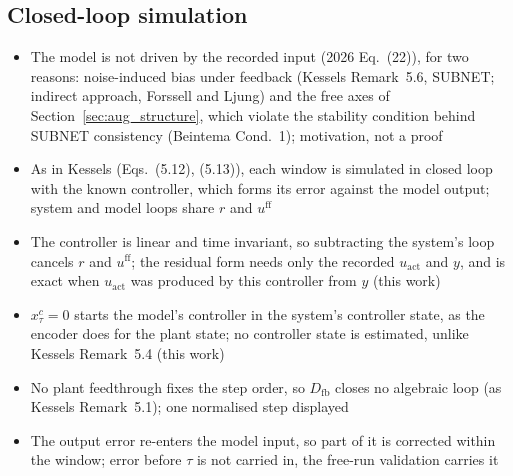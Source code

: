 

\subsection{Closed-loop simulation}\label{sec:aug_loop}
\ifdraft
\begin{itemize}
\item The model is not driven by the recorded input (2026 Eq.~(22)), for two reasons: noise-induced bias under feedback (Kessels Remark~5.6, SUBNET; indirect approach, Forssell and Ljung) and the free axes of Section~\ref{sec:aug_structure}, which violate the stability condition behind SUBNET consistency (Beintema Cond.~1); motivation, not a proof
\item As in Kessels (Eqs.~(5.12), (5.13)), each window is simulated in closed loop with the known controller, which forms its error against the model output; system and model loops share $r$ and $u^{\mathrm{ff}}$
\item The controller is linear and time invariant, so subtracting the system's loop cancels $r$ and $u^{\mathrm{ff}}$; the residual form needs only the recorded $u_{\mathrm{act}}$ and $y$, and is exact when $u_{\mathrm{act}}$ was produced by this controller from $y$ (this work)
\item $x^{c}_\tau=0$ starts the model's controller in the system's controller state, as the encoder does for the plant state; no controller state is estimated, unlike Kessels Remark~5.4 (this work)
\item No plant feedthrough fixes the step order, so $D_{\mathrm{fb}}$ closes no algebraic loop (as Kessels Remark~5.1); one normalised step displayed
\item The output error re-enters the model input, so part of it is corrected within the window; error before $\tau$ is not carried in, the free-run validation carries it
\end{itemize}
\fi
%
